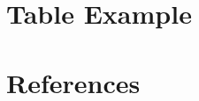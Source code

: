 \documentclass[12pt, a4paper]{article}
\begin{document}

\thispagestyle{empty}

\pagebreak


\pagebreak

% 
\section{Table Example}


\pagebreak

\appendix

\section{References}
\printbibliography[heading=none]

\pagebreak[4]

% 
\end{document}
